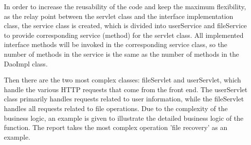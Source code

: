 \documentclass[a4paper,11pt]{article}
\begin{document}
\par In order to increase the reusability of the code and keep the maximum flexibility, as the relay point between the servlet class and the interface implementation class, the service class is created, which is divided into userService and fileService to provide corresponding service (method) for the servlet class. All implemented interface methods will be invoked in the corresponding service class, so the number of methods in the service is the same as the number of methods in the DaoImpl class.

\par Then there are the two most complex classes: fileServlet and userServlet, which handle the various HTTP requests that come from the front end. The userServlet class primarily handles requests related to user information, while the fileServlet handles all requests related to file operations. Due to the complexity of the business logic, an example is given to illustrate the detailed business logic of the function. The report takes the most complex operation 'file recovery' as an example.
\end{document}
